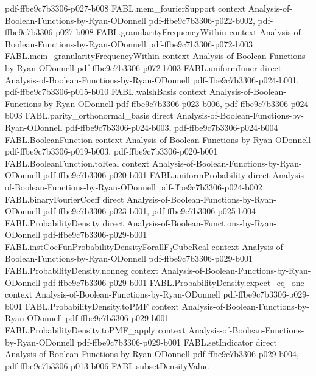 \begin{theorem}
{    pdf-ffbe9c7b3306-p027-b008}
\proofstep
  {FABL.mem_fourierSupport}
  {context}
  {Analysis-of-Boolean-Functions-by-Ryan-ODonnell}
  {pdf-ffbe9c7b3306-p022-b002,
    pdf-ffbe9c7b3306-p027-b008}
\proofstep
  {FABL.granularityFrequencyWithin}
  {context}
  {Analysis-of-Boolean-Functions-by-Ryan-ODonnell}
  {pdf-ffbe9c7b3306-p072-b003}
\proofstep
  {FABL.mem_granularityFrequencyWithin}
  {context}
  {Analysis-of-Boolean-Functions-by-Ryan-ODonnell}
  {pdf-ffbe9c7b3306-p072-b003}
\proofstep
  {FABL.uniformInner}
  {direct}
  {Analysis-of-Boolean-Functions-by-Ryan-ODonnell}
  {pdf-ffbe9c7b3306-p024-b001,
    pdf-ffbe9c7b3306-p015-b010}
\proofstep
  {FABL.walshBasis}
  {context}
  {Analysis-of-Boolean-Functions-by-Ryan-ODonnell}
  {pdf-ffbe9c7b3306-p023-b006,
    pdf-ffbe9c7b3306-p024-b003}
\proofstep
  {FABL.parity_orthonormal_basis}
  {direct}
  {Analysis-of-Boolean-Functions-by-Ryan-ODonnell}
  {pdf-ffbe9c7b3306-p024-b003,
    pdf-ffbe9c7b3306-p024-b004}
\proofstep
  {FABL.BooleanFunction}
  {context}
  {Analysis-of-Boolean-Functions-by-Ryan-ODonnell}
  {pdf-ffbe9c7b3306-p019-b003,
    pdf-ffbe9c7b3306-p020-b001}
\proofstep
  {FABL.BooleanFunction.toReal}
  {context}
  {Analysis-of-Boolean-Functions-by-Ryan-ODonnell}
  {pdf-ffbe9c7b3306-p020-b001}
\proofstep
  {FABL.uniformProbability}
  {direct}
  {Analysis-of-Boolean-Functions-by-Ryan-ODonnell}
  {pdf-ffbe9c7b3306-p024-b002}
\proofstep
  {FABL.binaryFourierCoeff}
  {direct}
  {Analysis-of-Boolean-Functions-by-Ryan-ODonnell}
  {pdf-ffbe9c7b3306-p023-b001,
    pdf-ffbe9c7b3306-p025-b004}
\proofstep
  {FABL.ProbabilityDensity}
  {direct}
  {Analysis-of-Boolean-Functions-by-Ryan-ODonnell}
  {pdf-ffbe9c7b3306-p029-b001}
\proofstep
  {FABL.instCoeFunProbabilityDensityForallF₂CubeReal}
  {context}
  {Analysis-of-Boolean-Functions-by-Ryan-ODonnell}
  {pdf-ffbe9c7b3306-p029-b001}
\proofstep
  {FABL.ProbabilityDensity.nonneg}
  {context}
  {Analysis-of-Boolean-Functions-by-Ryan-ODonnell}
  {pdf-ffbe9c7b3306-p029-b001}
\proofstep
  {FABL.ProbabilityDensity.expect_eq_one}
  {context}
  {Analysis-of-Boolean-Functions-by-Ryan-ODonnell}
  {pdf-ffbe9c7b3306-p029-b001}
\proofstep
  {FABL.ProbabilityDensity.toPMF}
  {context}
  {Analysis-of-Boolean-Functions-by-Ryan-ODonnell}
  {pdf-ffbe9c7b3306-p029-b001}
\proofstep
  {FABL.ProbabilityDensity.toPMF_apply}
  {context}
  {Analysis-of-Boolean-Functions-by-Ryan-ODonnell}
  {pdf-ffbe9c7b3306-p029-b001}
\proofstep
  {FABL.setIndicator}
  {direct}
  {Analysis-of-Boolean-Functions-by-Ryan-ODonnell}
  {pdf-ffbe9c7b3306-p029-b004,
    pdf-ffbe9c7b3306-p013-b006}
\proofstep
  {FABL.subsetDensityValue}

\end{theorem}
